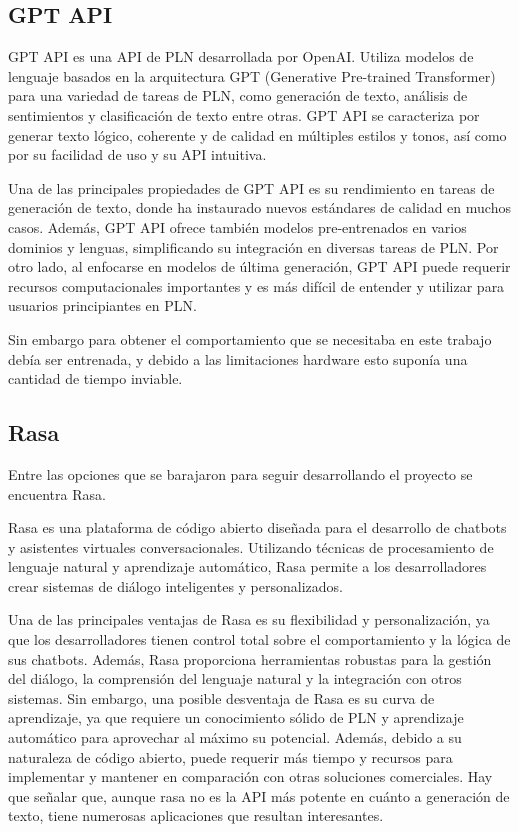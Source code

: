 \subsection{GPT API}

GPT API es una API de PLN desarrollada por OpenAI. Utiliza modelos de lenguaje basados en la arquitectura GPT (Generative Pre-trained Transformer) para una variedad de tareas de PLN, como generación de texto, análisis de sentimientos y clasificación de texto entre otras. GPT API se caracteriza por generar texto lógico, coherente y de calidad en múltiples estilos y tonos, así como por su facilidad de uso y su API intuitiva.

Una de las principales propiedades de GPT API es su rendimiento en tareas de generación de texto, donde ha instaurado nuevos estándares de calidad en muchos casos. Además, GPT API ofrece también modelos pre-entrenados en varios dominios y lenguas, simplificando su integración en diversas tareas de PLN. Por otro lado, al enfocarse en modelos de última generación, GPT API puede requerir recursos computacionales importantes y es más difícil de entender y utilizar para usuarios principiantes en PLN.

Sin embargo para obtener el comportamiento que se necesitaba en este trabajo debía ser entrenada, y debido a las limitaciones hardware esto suponía una cantidad de tiempo inviable. 

\subsection{Rasa}
\label{subsec:rasa}
Entre las opciones que se barajaron para seguir desarrollando el proyecto se encuentra Rasa.

Rasa es una plataforma de código abierto diseñada para el desarrollo de chatbots y asistentes virtuales conversacionales. Utilizando técnicas de procesamiento de lenguaje natural y aprendizaje automático, Rasa permite a los desarrolladores crear sistemas de diálogo inteligentes y personalizados.

Una de las principales ventajas de Rasa es su flexibilidad y personalización, ya que los desarrolladores tienen control total sobre el comportamiento y la lógica de sus chatbots. Además, Rasa proporciona herramientas robustas para la gestión del diálogo, la comprensión del lenguaje natural y la integración con otros sistemas. Sin embargo, una posible desventaja de Rasa es su curva de aprendizaje, ya que requiere un conocimiento sólido de PLN y aprendizaje automático para aprovechar al máximo su potencial. Además, debido a su naturaleza de código abierto, puede requerir más tiempo y recursos para implementar y mantener en comparación con otras soluciones comerciales. Hay que señalar que, aunque rasa no es la API más potente en cuánto a generación de texto, tiene numerosas aplicaciones que resultan interesantes. 

